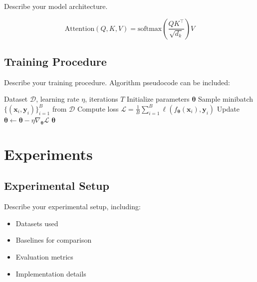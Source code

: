 \documentclass[10pt,a4paper,twocolumn]{article}
\newcommand{\x}{\mathbf{x}}
\newcommand{\y}{\mathbf{y}}
\newcommand{\thetab}{\boldsymbol{\theta}}
\begin{document}
Describe your model architecture.

\begin{equation}
    \text{Attention}(Q, K, V) = \text{softmax}\left(\frac{QK^\top}{\sqrt{d_k}}\right)V
\end{equation}

\subsection{Training Procedure}
\label{sec:training}

Describe your training procedure. Algorithm pseudocode can be included:

\begin{algorithm}[t]
    \caption{Training Algorithm}
    \label{alg:training}
    \begin{algorithmic}[1]
        \REQUIRE Dataset $\mathcal{D}$, learning rate $\eta$, iterations $T$
        \STATE Initialize parameters $\thetab$
            \STATE Sample minibatch $\{(\x_i, \y_i)\}_{i=1}^B$ from $\mathcal{D}$
            \STATE Compute loss $\mathcal{L} = \frac{1}{B}\sum_{i=1}^B \ell(f_{\thetab}(\x_i), \y_i)$
            \STATE Update $\thetab \leftarrow \thetab - \eta \nabla_{\thetab} \mathcal{L}$
        \ENDFOR
        \RETURN $\thetab$
    \end{algorithmic}
\end{algorithm}


\section{Experiments}
\label{sec:experiments}

\subsection{Experimental Setup}
\label{sec:setup}

Describe your experimental setup, including:
\begin{itemize}[nosep]
    \item Datasets used
    \item Baselines for comparison
    \item Evaluation metrics
    \item Implementation details
\end{itemize}
\end{document}
